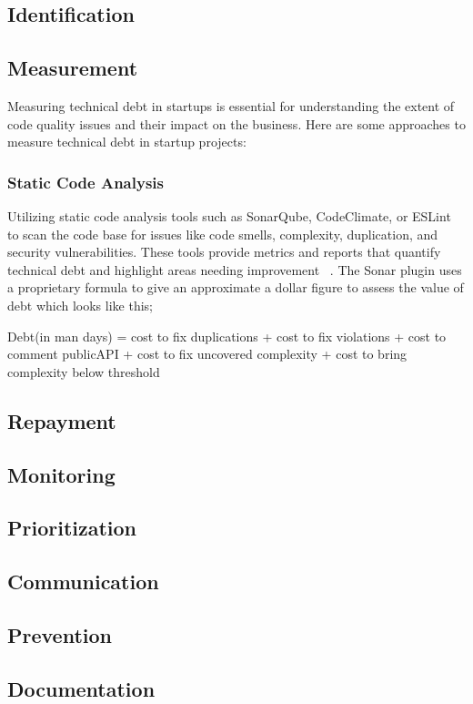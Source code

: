 \documentclass[manuscript]{acmart}
\begin{document}
\subsection{Identification}

\subsection{Measurement}
Measuring technical debt in startups is essential for understanding the extent of code quality issues and their impact on the business. Here are some approaches to measure technical debt in startup projects:

\subsubsection{Static Code Analysis} 
Utilizing static code analysis tools such as SonarQube, CodeClimate, or ESLint to scan the code base for issues like code smells, complexity, duplication, and security vulnerabilities. These tools provide metrics and reports that quantify technical debt and highlight areas needing improvement ~\cite{Whopayso60:online}. The Sonar plugin uses a proprietary formula to give an approximate a dollar figure to assess the value of debt which looks like this;

Debt(in man days) = cost to fix duplications + cost to fix violations + cost to comment publicAPI + cost to fix uncovered complexity + cost to bring complexity below threshold

\subsection{Repayment}

\subsection{Monitoring}
\subsection{Prioritization}
\subsection{Communication}
\subsection{Prevention}
\subsection{Documentation}
\end{document}
